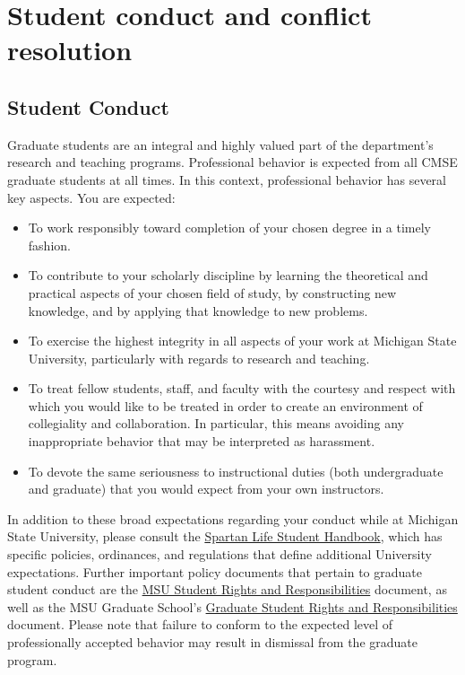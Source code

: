 \section{Student conduct and conflict resolution}

\subsection{Student Conduct}

Graduate students are an integral and highly valued part of the
department's research and teaching programs.  Professional behavior is
expected from all CMSE graduate students at all times.  In this
context, professional behavior has several key aspects.  You are
expected:

\begin{itemize}

\item To work responsibly toward completion of your chosen degree in a
timely fashion.

\item To contribute to your scholarly discipline by learning the
theoretical and practical aspects of your chosen field of study, by
constructing new knowledge, and by applying that knowledge to new
problems.

\item To exercise the highest integrity in all aspects of your work at
Michigan State University, particularly with regards to research and
teaching.

\item To treat fellow students, staff, and faculty with the courtesy
and respect with which you would like to be treated in order to create
an environment of collegiality and collaboration.  In particular, this
means avoiding any inappropriate behavior that may be interpreted as
harassment.

\item To devote the same seriousness to instructional duties (both
undergraduate and graduate) that you would expect from your own
instructors.

\end{itemize}

\noindent
In addition to these broad expectations regarding your conduct while
at Michigan State University, please consult the
\href{http://splife.studentlife.msu.edu/}{Spartan Life Student
Handbook}, which has specific policies, ordinances, and regulations
that define additional University expectations.  Further important
policy documents that pertain to graduate student conduct are the
\href{http://splife.studentlife.msu.edu/academic-freedom-for-students-at-michigan-state-university}{MSU
Student Rights and Responsibilities} document, as well as the MSU
Graduate School's \href{https://grad.msu.edu/gsrr}{Graduate Student
Rights and Responsibilities} document.  Please note that failure to
conform to the expected level of professionally accepted behavior may
result in dismissal from the graduate program.

